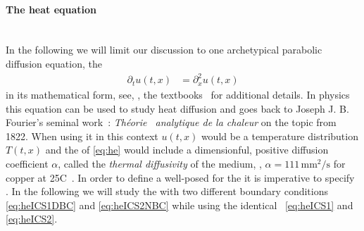 \paragraph{The heat equation}\label{paragraph:HE}\mbox{} \\
In the following we will limit our discussion to one archetypical parabolic diffusion equation, \viz{} the \he{}~\cite{Fourier2009Jul}
\begin{align}
\partial_t u(t,x) &= \partial_x^2u(t,x) \label{eq:he}
\end{align}
in its mathematical form, see, \eg{}, the textbooks~\cite{Cannon:1984,LeVeque:1992,LeVeque:2002} for additional details.
In physics this equation can be used to study heat diffusion and goes back to Joseph J. B. Fourier's seminal work~\cite{Fourier2009Jul}: \emph{Th{\ifmmode{}\else\'{e}\fi}orie \
analytique de la chaleur} on the topic from 1822. 
When using it in this context $u(t,x)$ would be a temperature distribution $T(t,x)$ and the \rhs{} of \cref{eq:he} would include a dimensionful, positive diffusion coefficient $\alpha$, called the \textit{thermal diffusivity} of the medium, \ie{}, $\alpha=111\,\mathrm{mm}^2/\mathrm{s}$ for copper at 25\textdegree{}C~\cite{CASALEGNO201083}.
In order to define a well-posed \ivp{} for the \heq{} it is imperative to specify \bcs{}.
In the following we will study the \heq{} with two different boundary conditions \eqref{eq:heICS1DBC} and \eqref{eq:heICS2NBC} while using the identical \ics{}~\eqref{eq:heICS1} and \eqref{eq:heICS2}.


